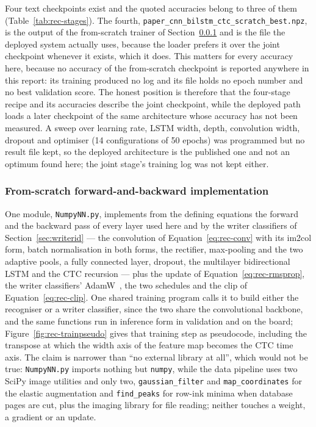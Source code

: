 Four text checkpoints exist and the quoted accuracies belong to three of them (Table~\ref{tab:rec-stages}).
The fourth, \texttt{paper\_cnn\_bilstm\_ctc\_scratch\_best.npz}, is the output of the from-scratch trainer of Section~\ref{sec:textrec-numpynn} and is the file the deployed system actually uses, because the loader prefers it over the joint checkpoint whenever it exists, which it does.
This matters for every accuracy here, because no accuracy of the from-scratch checkpoint is reported anywhere in this report: its training produced no log and its file holds no epoch number and no best validation score.
The honest position is therefore that the four-stage recipe and its accuracies describe the joint checkpoint, while the deployed path loads a later checkpoint of the same architecture whose accuracy has not been measured.
A sweep over learning rate, LSTM width, depth, convolution width, dropout and optimiser (14 configurations of 50 epochs) was programmed but no result file kept, so the deployed architecture is the published one and not an optimum found here; the joint stage's training log was not kept either.

\subsubsection{From-scratch forward-and-backward implementation}
\label{sec:textrec-numpynn}

One module, \texttt{NumpyNN.py}, implements from the defining equations the forward and the backward pass of every layer used here and by the writer classifiers of Section~\ref{sec:writerid} --- the convolution of Equation~\ref{eq:rec-conv} with its im2col form, batch normalisation in both forms, the rectifier, max-pooling and the two adaptive pools, a fully connected layer, dropout, the multilayer bidirectional LSTM and the CTC recursion --- plus the update of Equation~\ref{eq:rec-rmsprop}, the writer classifiers' AdamW~\cite{loshchilov2019}, the two schedules and the clip of Equation~\ref{eq:rec-clip}.
One shared training program calls it to build either the recogniser or a writer classifier, since the two share the convolutional backbone, and the same functions run in inference form in validation and on the board; Figure~\ref{fig:rec-trainpseudo} gives that training step as pseudocode, including the transpose at which the width axis of the feature map becomes the CTC time axis.
The claim is narrower than ``no external library at all'', which would not be true: \texttt{NumpyNN.py} imports nothing but \texttt{numpy}, while the data pipeline uses two SciPy image utilities and only two, \texttt{gaussian\_filter} and \texttt{map\_coordinates} for the elastic augmentation and \texttt{find\_peaks} for row-ink minima when database pages are cut, plus the imaging library for file reading; neither touches a weight, a gradient or an update.


